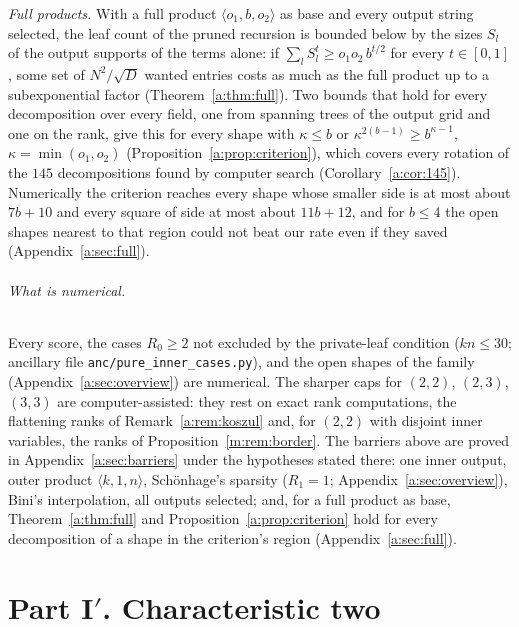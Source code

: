 \documentclass[11pt]{article}
\theoremstyle{definition}
\theoremstyle{remark}
\begin{document}
\emph{Full products.} With a full product $\langle o_1,b,o_2\rangle$ as base and every output string selected, the leaf count of the pruned recursion is bounded below by the sizes $S_l$ of the output supports of the terms alone: if $\sum_lS_l^t\ge o_1o_2\,b^{t/2}$ for every $t\in[0,1]$, some set of $N^2/\sqrt D$ wanted entries costs as much as the full product up to a subexponential factor (Theorem~\ref{a:thm:full}). Two bounds that hold for every decomposition over every field, one from spanning trees of the output grid and one on the rank, give this for every shape with $\kappa\le b$ or $\kappa^{2(b-1)}\ge b^{\kappa-1}$, $\kappa=\min(o_1,o_2)$ (Proposition~\ref{a:prop:criterion}), which covers every rotation of the $145$ decompositions found by computer search (Corollary~\ref{a:cor:145}). Numerically the criterion reaches every shape whose smaller side is at most about $7b+10$ and every square of side at most about $11b+12$, and for $b\le4$ the open shapes nearest to that region could not beat our rate even if they saved (Appendix~\ref{a:sec:full}).

\paragraph{What is numerical.} Every score, the cases $R_0\ge2$ not excluded by the private-leaf condition ($kn\le30$; ancillary file \texttt{anc/pure\_inner\_cases.py}), and the open shapes of the family (Appendix~\ref{a:sec:overview}) are numerical. The sharper caps for $(2,2)$, $(2,3)$, $(3,3)$ are computer-assisted: they rest on exact rank computations, the flattening ranks of Remark~\ref{a:rem:koszul} and, for $(2,2)$ with disjoint inner variables, the ranks of Proposition~\ref{m:rem:border}. The barriers above are proved in Appendix~\ref{a:sec:barriers} under the hypotheses stated there: one inner output, outer product $\langle k,1,n\rangle$, Schönhage's sparsity ($R_1=1$; Appendix~\ref{a:sec:overview}), Bini's interpolation, all outputs selected; and, for a full product as base, Theorem~\ref{a:thm:full} and Proposition~\ref{a:prop:criterion} hold for every decomposition of a shape in the criterion's region (Appendix~\ref{a:sec:full}).

\FloatBarrier
{}\label{t:partIp}
\part*{Part I\texorpdfstring{$'$}{'}. Characteristic two}
\end{document}
